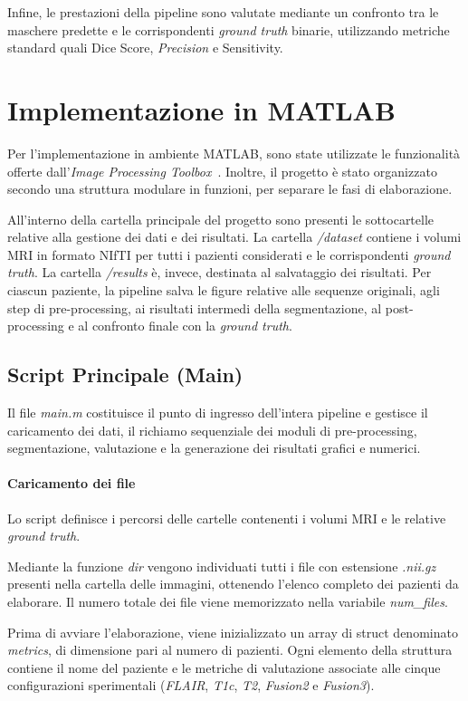 Infine, le prestazioni della pipeline sono valutate mediante un confronto tra le maschere predette e le corrispondenti \textit{ground truth} binarie, utilizzando metriche standard quali Dice Score, \textit{Precision} e Sensitivity.

\section{Implementazione in MATLAB}
Per l'implementazione in ambiente MATLAB, sono state utilizzate le funzionalità offerte dall’\textit{Image Processing Toolbox}~\cite{matlab2025b}. Inoltre, il progetto è stato organizzato secondo una struttura modulare in funzioni, per separare le fasi di elaborazione.

All’interno della cartella principale del progetto sono presenti le sottocartelle relative alla gestione dei dati e dei risultati. La cartella \textit{/dataset} contiene i volumi MRI in formato NIfTI per tutti i pazienti considerati e le corrispondenti \textit{ground truth}. La cartella \textit{/results} è, invece, destinata al salvataggio dei risultati. Per ciascun paziente, la pipeline salva le figure relative alle sequenze originali, agli step di pre-processing, ai risultati intermedi della segmentazione, al post-processing e al confronto finale con la \textit{ground truth}.

\subsection{Script Principale (Main)}
Il file \textit{main.m} costituisce il punto di ingresso dell’intera pipeline e gestisce il caricamento dei dati, il richiamo sequenziale dei moduli di pre-processing, segmentazione, valutazione e la generazione dei risultati grafici e numerici.

\paragraph{Caricamento dei file}
Lo script definisce i percorsi delle cartelle contenenti i volumi MRI e le relative \textit{ground truth}.

Mediante la funzione \textit{dir} vengono individuati tutti i file con estensione \textit{.nii.gz} presenti nella cartella delle immagini, ottenendo l’elenco completo dei pazienti da elaborare. Il numero totale dei file viene memorizzato nella variabile \textit{num\_files}.

Prima di avviare l’elaborazione, viene inizializzato un array di struct denominato \textit{metrics}, di dimensione pari al numero di pazienti. Ogni elemento della struttura contiene il nome del paziente e le metriche di valutazione associate alle cinque configurazioni sperimentali (\textit{FLAIR}, \textit{T1c}, \textit{T2}, \textit{Fusion2} e \textit{Fusion3}).

